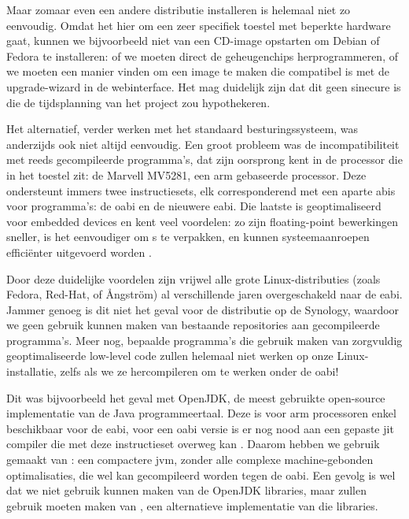 Maar zomaar even een andere distributie installeren is helemaal niet zo eenvoudig. Omdat het hier om een zeer specifiek toestel met beperkte hardware gaat, kunnen we bijvoorbeeld niet van een CD-image opstarten om Debian of Fedora te installeren: of we moeten direct de geheugenchips herprogrammeren, of we moeten een manier vinden om een image te maken die compatibel is met de upgrade-wizard in de webinterface. Het mag duidelijk zijn dat dit geen sinecure is die de tijdsplanning van het project zou hypothekeren.

Het alternatief, verder werken met het standaard besturingssysteem, was anderzijds ook niet altijd eenvoudig. Een groot probleem was de incompatibiliteit met reeds gecompileerde programma's, dat zijn oorsprong kent in de processor die in het toestel zit: de Marvell MV5281, een \ac{arm} gebaseerde processor. Deze ondersteunt immers twee instructiesets, elk corresponderend met een aparte \acp{abi} voor programma's: de \ac{oabi} en de nieuwere \ac{eabi}. Die laatste is geoptimaliseerd voor embedded devices en kent veel voordelen: zo zijn floating-point bewerkingen sneller, is het eenvoudiger om s te verpakken, en kunnen systeemaanroepen efficiënter uitgevoerd worden \citep{linuxfordevices:eabi}.

Door deze duidelijke voordelen zijn vrijwel alle grote Linux-distributies (zoals Fedora, Red-Hat, of Ångström) al verschillende jaren overgeschakeld naar de \ac{eabi}. Jammer genoeg is dit niet het geval voor de distributie op de Synology, waardoor we geen gebruik kunnen maken van bestaande repositories aan gecompileerde programma's. Meer nog, bepaalde programma's die gebruik maken van zorgvuldig geoptimaliseerde low-level code zullen helemaal niet werken op onze Linux-installatie, zelfs als we ze hercompileren om te werken onder de \ac{oabi}!

Dit was bijvoorbeeld het geval met OpenJDK, de meest gebruikte open-source implementatie van de Java programmeertaal. Deze is voor \ac{arm} processoren enkel beschikbaar voor de \ac{eabi}, voor een \ac{oabi} versie is er nog nood aan een gepaste \ac{jit} compiler die met deze instructieset overweg kan \citep{synology:java}. Daarom hebben we gebruik gemaakt van : een compactere \ac{jvm}, zonder alle complexe machine-gebonden optimalisaties, die wel kan gecompileerd worden tegen de \ac{oabi}. Een gevolg is wel dat we niet gebruik kunnen maken van de OpenJDK libraries, maar zullen gebruik moeten maken van , een alternatieve implementatie van die libraries.

